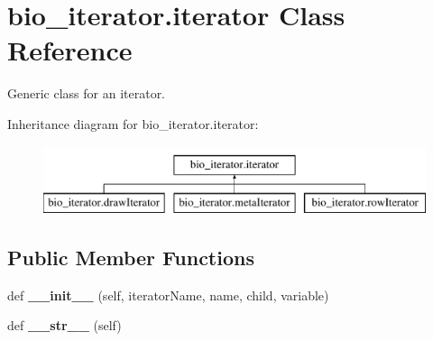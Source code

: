 \hypertarget{classbio__iterator_1_1iterator}{}\section{bio\+\_\+iterator.\+iterator Class Reference}
\label{classbio__iterator_1_1iterator}


Generic class for an iterator.  


Inheritance diagram for bio\+\_\+iterator.\+iterator\+:\begin{figure}[H]
\begin{center}
\leavevmode
\includegraphics[height=2.000000cm]{classbio__iterator_1_1iterator}
\end{center}
\end{figure}
\subsection*{Public Member Functions}
\begin{DoxyCompactItemize}
\item 
def {\bfseries \+\_\+\+\_\+init\+\_\+\+\_\+} (self, iterator\+Name, name, child, variable)\hypertarget{classbio__iterator_1_1iterator_a938eec8f7f8398efabc0e94e0e69a9c7}{}\label{classbio__iterator_1_1iterator_a938eec8f7f8398efabc0e94e0e69a9c7}

\item 
def {\bfseries \+\_\+\+\_\+str\+\_\+\+\_\+} (self)\hypertarget{classbio__iterator_1_1iterator_a3015cba9030f10b6de833c03f632fa2a}{}\label{classbio__iterator_1_1iterator_a3015cba9030f10b6de833c03f632fa2a}

\end{DoxyCompactItemize}
